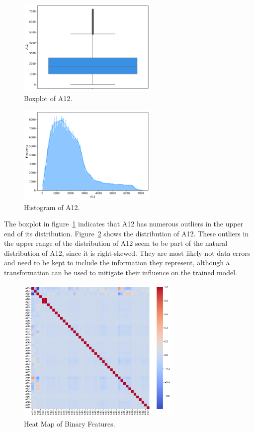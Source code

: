 \documentclass[11pt]{report}
\begin{document}
\begin{figure}[H]
    \centering
    \includegraphics[width=0.6\textwidth]{images/A12_boxplot.pdf}
    \caption{Boxplot of A12.}
    \label{fig:a12_boxplot}
\end{figure}


\begin{figure}[H]
    \centering
    \includegraphics[width=0.6\textwidth]{images/A12_histplot.pdf}
    \caption{Histogram of A12.}
    \label{fig:a12_histplot}
\end{figure}

The boxplot in figure~\ref{fig:a12_boxplot} indicates that A12 has numerous outliers in the upper end of its distribution. Figure~\ref{fig:a12_histplot} shows the distribution of A12. These outliers in the upper range of the distribution of A12 seem to be part of the natural distribution of A12, since it is right-skewed. They are most likely not data errors and need to be kept to include the information they represent, although a transformation can be used to mitigate their influence on the trained model.

\begin{figure}[H]
    \centering
    \includegraphics[width=0.7\textwidth]{images/binary_heatmap.pdf}
    \caption{Heat Map of Binary Features.}
    \label{fig:binary_heatmap}
\end{figure}
\end{document}
